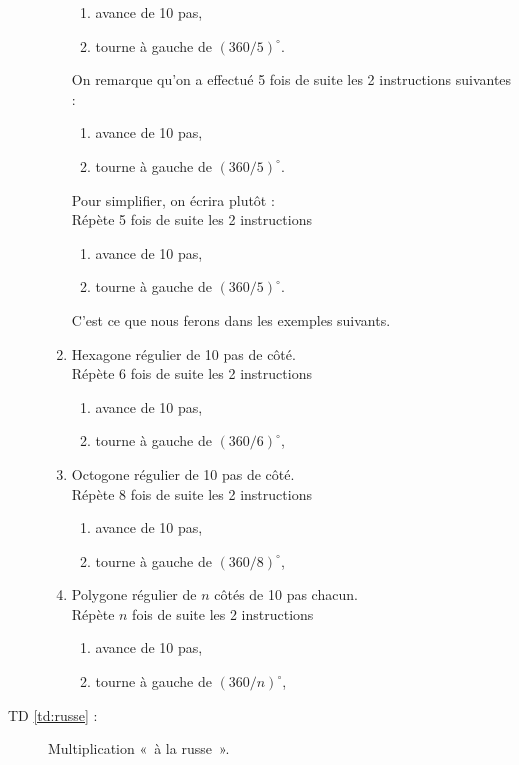 \begin{description}
\begin{enumerate}
\begin{minipage}{6cm}
\begin{enumerate}
		\item avance de 10 pas,
		\item tourne à gauche de $(360/5)^\circ$.
		\end{enumerate}
		\end{minipage}
		\hfill
		\begin{minipage}{7cm}
		On remarque qu'on a effectué 5 fois de suite les 2 instructions 
		suivantes :
		\begin{enumerate}
		\item avance de 10 pas,
		\item tourne à gauche de $(360/5)^\circ$.
		\end{enumerate}
		Pour simplifier, on écrira plutôt :\\
		Répète 5 fois de suite les 2 instructions
		\begin{enumerate}
		\item avance de 10 pas,
		\item tourne à gauche de $(360/5)^\circ$.
		\end{enumerate}
		C'est ce que nous ferons dans les exemples suivants.
		\end{minipage}
	\item Hexagone régulier de 10 pas de côté.\\
		Répète 6 fois de suite les 2 instructions 
		\begin{enumerate}
		\item avance de 10 pas,
		\item tourne à gauche de $(360/6)^\circ$,
		\end{enumerate}
	\item Octogone régulier de 10 pas de côté.\\
		Répète 8 fois de suite les 2 instructions 
		\begin{enumerate}
		\item avance de 10 pas,
		\item tourne à gauche de $(360/8)^\circ$,
		\end{enumerate}
	\item Polygone régulier de $n$ côtés de 10 pas chacun.\\
		Répète $n$ fois de suite les 2 instructions 
		\begin{enumerate}
		\item avance de 10 pas,
		\item tourne à gauche de $(360/n)^\circ$,
		\end{enumerate}
	\end{enumerate}
\newpage
\item[TD \ref{td:russe} :] Multiplication «~à la russe~».
	

\end{description}
